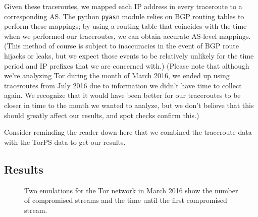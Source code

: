Given these traceroutes, we mapped each IP address in every traceroute
to a corresponding AS.  The python {\tt pyasn} module relies on BGP
routing tables to perform these mappings; by using a routing table that
coincides with the time when we performed our traceroutes, we can obtain
accurate AS-level mappings.  (This method of course is subject to
inaccuracies in the event of BGP route hijacks or leaks, but we expect
those events to be relatively unlikely for the time period and IP
prefixes that we are concerned with.)  (Please note that although we're 
analyzing Tor during the month of March 2016, we ended up using traceroutes from 
July 2016 due to information we didn't have time to collect again.  We recognize 
that it would have been better for our traceroutes to be closer in time to the 
month we wanted to analyze, but we don't 
believe that this should greatly affect our results, and spot checks confirm 
this.)  

Consider reminding the reader down here that we combined the traceroute data with the TorPS 
data to get our results.

\subsection{Results}

\begin{figure}[t]
\centering
{}
\caption{Two emulations for the Tor network in March 2016 show the
  number of compromised streams and the time until the first compromised
  stream.} 
\label{fig:compromise-stream-time}
\end{figure}

